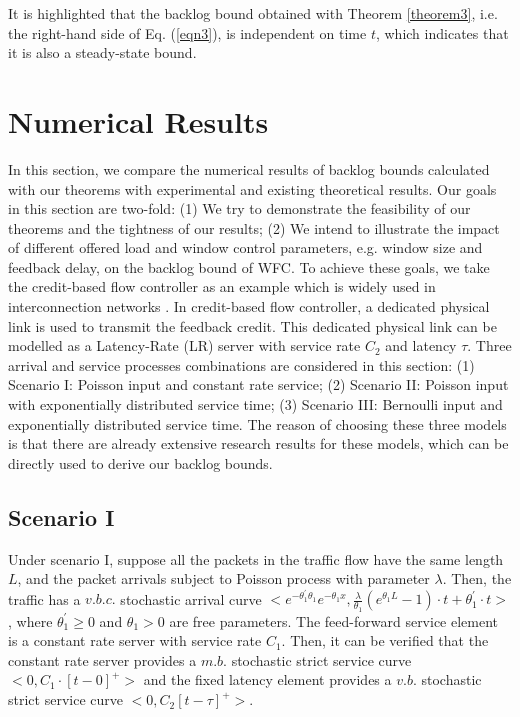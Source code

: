 \documentclass[12pt]{article}
\begin{document}
It is highlighted that the backlog bound obtained with Theorem \ref{theorem3}, i.e. the right-hand side of Eq. (\ref{eqn3}), is
independent on time $t$, which indicates that it is also a steady-state bound.

\section{Numerical Results}\label{experiments}
In this section, we compare the numerical results of backlog bounds calculated with our theorems with experimental and existing theoretical results. Our goals in this section are two-fold: (1) We try to demonstrate the feasibility of our theorems and the tightness of our results; (2) We intend to illustrate the impact of different offered load and window control parameters, e.g. window size and feedback delay, on the backlog bound of WFC. To achieve these goals, we take the credit-based flow controller as an example which is widely used in interconnection networks \cite{DaTo04}. In credit-based flow controller, a dedicated physical link is used to transmit the feedback credit. This dedicated physical link can be modelled as a Latency-Rate (LR) server \cite{StVa98} with service rate $C_2$ and latency $\tau$. Three arrival and service processes combinations are considered in this section: (1) Scenario I: Poisson input and constant rate service; (2) Scenario II: Poisson input with exponentially distributed service time; (3) Scenario III: Bernoulli input and exponentially distributed service time. The reason of choosing these three models is that there are already extensive research results for these models, which can be directly used to derive our backlog bounds.

\subsection{Scenario I}
Under scenario I, suppose all the packets in the traffic flow have the same length $L$, and the packet arrivals subject to Poisson process with parameter $\lambda$. Then, the traffic has a $v.b.c.$ stochastic arrival curve $<e^{-\theta_1^\prime\theta_1}e^{-\theta_1 x},\frac{\lambda}{\theta_1}(e^{\theta_1 L}-1)\cdot t+\theta_1^\prime\cdot t>$ \cite{jiang2010note}, where $\theta_1^\prime\geq 0$ and $\theta_1>0$ are free parameters. The feed-forward service element is a constant rate server with service rate $C_1$. Then, it can be verified that the constant rate server provides a $m.b.$ stochastic strict service curve $<0,C_1\cdot [t-0]^+>$ and the fixed latency element provides a $v.b.$ stochastic strict service curve $<0,C_2[t-\tau]^+>$.
\end{document}
